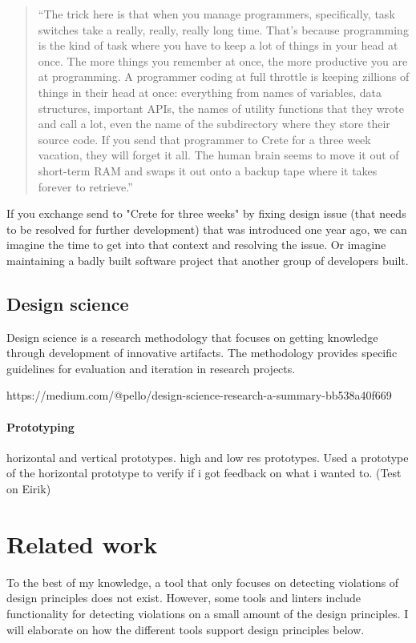 \documentclass{report}
\begin{document}
\begin{quote}
    ``The trick here is that when you manage programmers, specifically, task switches take a really, really, really long time. That’s because programming is the kind of task where you have to keep a lot of things in your head at once. The more things you remember at once, the more productive you are at programming. A programmer coding at full throttle is keeping zillions of things in their head at once: everything from names of variables, data structures, important APIs, the names of utility functions that they wrote and call a lot, even the name of the subdirectory where they store their source code. If you send that programmer to Crete for a three week vacation, they will forget it all. The human brain seems to move it out of short-term RAM and swaps it out onto a backup tape where it takes forever to retrieve.'' \cite{human-context-switching}
\end{quote} 
If you exchange send to "Crete for three weeks" by fixing design issue (that needs to be resolved for further development) that was introduced one year ago, we can imagine the time to get into that context and resolving the issue. Or imagine maintaining a badly built software project that another group of developers built.


\section{Design science}
Design science is a research methodology that focuses on getting knowledge through development of innovative artifacts. The methodology provides specific guidelines for evaluation and iteration in research projects.

https://medium.com/@pello/design-science-research-a-summary-bb538a40f669

\subsubsection{Prototyping}

horizontal and vertical prototypes. high and low res prototypes.
Used a prototype of the horizontal prototype to verify if i got feedback on what i wanted to. (Test on Eirik)


\chapter{Related work}
\label{relatedwork}
To the best of my knowledge, a tool that only focuses on detecting violations of design principles does not exist. However, some tools and linters include functionality for detecting violations on a small amount of the design principles. I will elaborate on how the different tools support design principles below.
\end{document}
